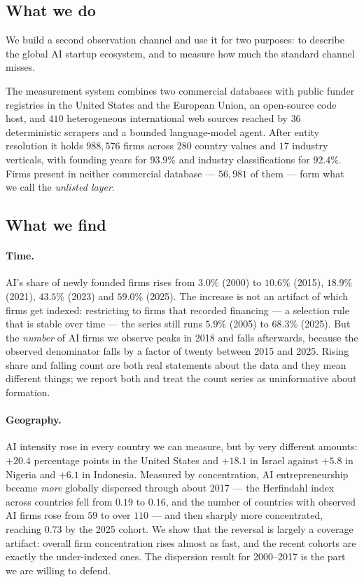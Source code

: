\documentclass[11pt]{article}
\begin{document}
\subsection{What we do}

We build a second observation channel and use it for two purposes: to describe
the global AI startup ecosystem, and to measure how much the standard channel
misses.

The measurement system combines two commercial databases with public funder
registries in the United States and the European Union, an open-source code
host, and $410$ heterogeneous international web sources reached by $36$
deterministic scrapers and a bounded language-model agent. After entity
resolution it holds $988{,}576$ firms across $280$ country values and
$17$ industry verticals, with founding years for $93.9\%$ and industry
classifications for $92.4\%$. Firms present in neither commercial database ---
$56{,}981$ of them --- form what we call the \emph{unlisted layer}.

\subsection{What we find}

\paragraph{Time.} AI's share of newly founded firms rises from $3.0\%$ (2000)
to $10.6\%$ (2015), $18.9\%$ (2021), $43.5\%$ (2023) and $59.0\%$ (2025). The
increase is not an artifact of which firms get indexed: restricting to firms
that recorded financing --- a selection rule that is stable over time --- the
series still runs $5.9\%$ (2005) to $68.3\%$ (2025). But the \emph{number} of
AI firms we observe peaks in 2018 and falls afterwards, because the observed
denominator falls by a factor of twenty between 2015 and 2025. Rising share and
falling count are both real statements about the data and they mean different
things; we report both and treat the count series as uninformative about
formation.

\paragraph{Geography.} AI intensity rose in every country we can measure, but
by very different amounts: $+20.4$ percentage points in the United States and
$+18.1$ in Israel against $+5.8$ in Nigeria and $+6.1$ in Indonesia. Measured
by concentration, AI entrepreneurship became \emph{more} globally dispersed
through about 2017 --- the Herfindahl index across countries fell from $0.19$
to $0.16$, and the number of countries with observed AI firms rose from $59$ to
over $110$ --- and then sharply more concentrated, reaching $0.73$ by the 2025
cohort. We show that the reversal is largely a coverage artifact: overall firm
concentration rises almost as fast, and the recent cohorts are exactly the
under-indexed ones. The dispersion result for 2000--2017 is the part we are
willing to defend.
\end{document}
